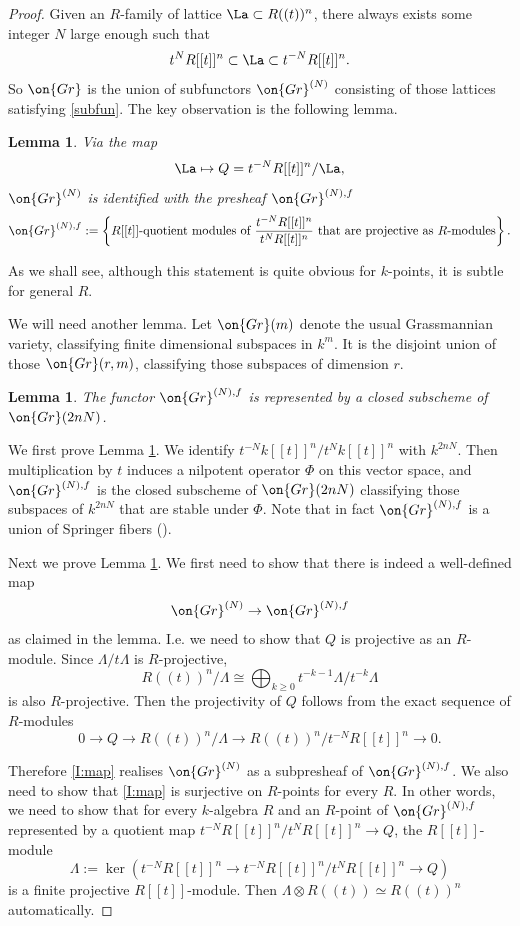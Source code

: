 \documentclass[]{pcmi}
\theoremstyle{plain}
\newtheorem{lem}[equation]{Lemma}
\theoremstyle{remark}
\theoremstyle{definition}
\newcommand{\Gr}{{\on{Gr}}}
\begin{document}
\begin{proof}
Given an $R$-family of lattice $\La\subset R((t))^n$, there always exists some integer $N$ large enough such that 
\begin{equation}\label{subfun}
t^NR[[t]]^n\subset \La\subset t^{-N}R[[t]]^n.
\end{equation}
So $\Gr$ is the union of subfunctors $\Gr^{(N)}$ consisting of those lattices satisfying \eqref{subfun}.
The key observation is the following lemma.
\begin{lem}\label{projectivity}
Via the map
$$\La\mapsto Q=t^{-N}R[[t]]^n/\La,$$ $\Gr^{(N)}$ is identified with the presheaf $\Gr^{(N),f}$
\[\Gr^{(N),f}:=\left\{R[[t]] \mbox{-quotient modules of } \frac{t^{-N}R[[t]]^n}{t^NR[[t]]^n} \mbox{ that are projective as }R\mbox{-modules}\right\}.\] 
\end{lem}
As we shall see, although this statement is quite obvious for $k$-points, it is subtle for general $R$.

We will need another lemma.
Let $\Gr(m)$ denote the usual Grassmannian variety, classifying finite dimensional subspaces in $k^m$. It is the disjoint union of those $\Gr(r,m)$, classifying those subspaces of dimension $r$. 
\begin{lem}\label{Embedding}
The functor $\Gr^{(N),f}$ is represented by a closed subscheme of $\Gr(2nN)$. 
\end{lem}
We first prove Lemma \ref{Embedding}. We identify $t^{-N}k[[t]]^n/t^Nk[[t]]^n$ with $k^{2nN}$. Then multiplication by $t$ induces a nilpotent operator $\Phi$ on this vector space, and $\Gr^{(N),f}$ is the closed subscheme of $\Gr(2nN)$ classifying those subspaces of $k^{2nN}$ that are stable under $\Phi$. Note that in fact $\Gr^{(N),f}$ is a union of Springer fibers (\cite[\S~1]{Yu}).

Next we prove Lemma \ref{projectivity}. We first need to show that there is indeed a well-defined map
\begin{equation}\label{I:map}
\Gr^{(N)}\to \Gr^{(N),f}
\end{equation}
as claimed in the lemma. I.e. we need to show that $Q$ is projective as an $R$-module. Since $\Lambda/t\Lambda$ is $R$-projective,
$$R((t))^n/\Lambda\cong\bigoplus_{k\geq 0}t^{-k-1}\Lambda/t^{-k}\Lambda$$ is also $R$-projective. Then the projectivity of $Q$ follows from the exact sequence of $R$-modules
\[0\to Q\to R((t))^n/\Lambda\to R((t))^n/t^{-N}R[[t]]^n\to 0.\]


Therefore \eqref{I:map} realises $\Gr^{(N)}$ as a subpresheaf of $\Gr^{(N),f}$. We also need to show that  \eqref{I:map} is surjective on $R$-points for every $R$. In other words, we need to show that for every $k$-algebra $R$ and an $R$-point of $\Gr^{(N),f}$ represented by a quotient map $ t^{-N}R[[t]]^n/t^NR[[t]]^n\to Q$, the $R[[t]]$-module
\[\Lambda:=\ker( t^{-N}R[[t]]^n\to  t^{-N}R[[t]]^n/t^NR[[t]]^n\to Q)\]
is a finite projective $R[[t]]$-module. Then $\Lambda\otimes R((t))\simeq R((t))^n$ automatically.



\end{proof}
\end{document}
